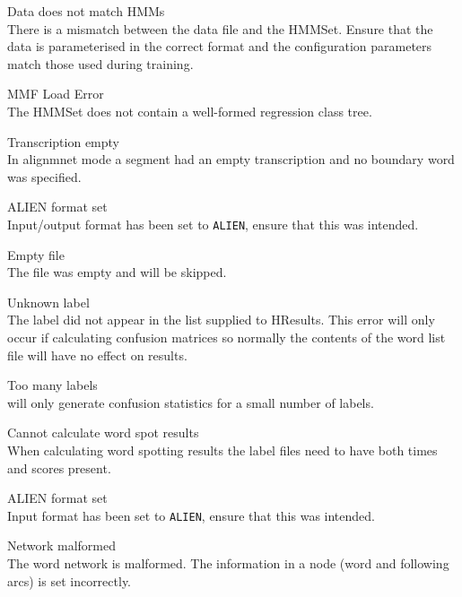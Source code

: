 \begin{itemize}
\begin{itemize}
 Data does not match HMMs\\
        There is a mismatch between the data file and the HMMSet.  Ensure that
        the data is parameterised in the correct format and the configuration
        parameters match those used during training.

 MMF Load Error\\
        The HMMSet does not contain a well-formed regression class tree.

 Transcription empty\\
        In alignmnet mode a segment had an empty transcription and no
        boundary word was specified.

    ALIEN format set\\
        Input/output format has been set to \texttt{ALIEN}, ensure that 
        this was intended.

\end{itemize}


\begin{itemize}
    Empty file\\
        The file was empty and will be skipped.

    Unknown label\\
        The label did not appear in the list supplied to HResults.
        This error will only occur if calculating confusion matrices so 
        normally the contents of the word list file will have no effect 
        on results.

    Too many labels\\
         will only generate confusion statistics for a small 
        number of labels.

 Cannot calculate word spot results\\
        When calculating word spotting results the label files need to have 
        both times and scores present.

    ALIEN format set\\
        Input format has been set to \texttt{ALIEN}, ensure that this was 
        intended.

\end{itemize}


\begin{itemize}
    Network malformed\\
        The word network is malformed. The information in a node (word
        and following arcs) is set incorrectly.


\end{itemize}
\end{itemize}
